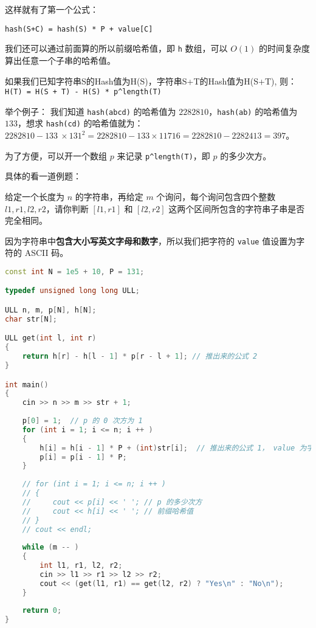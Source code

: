 这样就有了第一个公式：

\verb|hash(S+C) = hash(S) * P + value[C]|

我们还可以通过前面算的所以前缀哈希值，即 \verb|h| 数组，可以 $O(1)$ 的时间复杂度算出任意一个子串的哈希值。

如果我们已知字符串S的Hash值为H(S)，字符串S+T的Hash值为H(S+T),
则：\verb|H(T) = H(S + T) - H(S) * p^length(T)|

举个例子：
我们知道 \verb|hash(abcd)| 的哈希值为 $2282810$，\verb|hash(ab)| 的哈希值为 $133$，想求 \verb|hash(cd)| 的哈希值就为：
$2282810 - 133\  \times 131^2 = 2282810 - 133 \times 11716 = 2282810 - 2282413 = 397$。

为了方便，可以开一个数组 $p$ 来记录 \verb|p^length(T)|，即 $p$ 的多少次方。

具体的看一道例题：

给定一个长度为 $n$ 的字符串，再给定 $m$ 个询问，每个询问包含四个整数 $l1,r1,l2,r2$，请你判断 $[l1,r1]$ 和 $[l2,r2]$ 这两个区间所包含的字符串子串是否完全相同。

因为字符串中\textbf{包含大小写英文字母和数字}，所以我们把字符的 \verb|value| 值设置为字符的 ASCII 码。

\begin{lstlisting}[language=cpp]
const int N = 1e5 + 10, P = 131;

typedef unsigned long long ULL;

ULL n, m, p[N], h[N];
char str[N];

ULL get(int l, int r)
{
    return h[r] - h[l - 1] * p[r - l + 1]; // 推出来的公式 2
}

int main()
{
    cin >> n >> m >> str + 1;
    
    p[0] = 1;  // p 的 0 次方为 1
    for (int i = 1; i <= n; i ++ )
    {
        h[i] = h[i - 1] * P + (int)str[i];  // 推出来的公式 1， value 为字符的 ASCII
        p[i] = p[i - 1] * P;
    }
    
    // for (int i = 1; i <= n; i ++ )
    // {
    //     cout << p[i] << ' '; // p 的多少次方
    //     cout << h[i] << ' '; // 前缀哈希值
    // }
    // cout << endl;
    
    while (m -- )
    {
        int l1, r1, l2, r2;
        cin >> l1 >> r1 >> l2 >> r2;
        cout << (get(l1, r1) == get(l2, r2) ? "Yes\n" : "No\n");
    }
    
    return 0;
}
\end{lstlisting}
